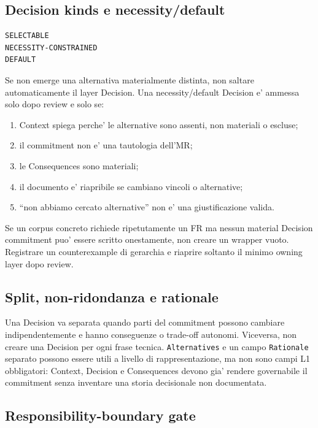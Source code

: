 \documentclass[11pt,a4paper]{article}
\begin{document}
\subsection{Decision kinds e necessity/default}
\closedtag

\begin{lstlisting}
SELECTABLE
NECESSITY-CONSTRAINED
DEFAULT
\end{lstlisting}

Se non emerge una alternativa materialmente distinta, non saltare automaticamente il layer Decision. Una necessity/default Decision e' ammessa solo dopo review e solo se:
\begin{enumerate}
  \item Context spiega perche' le alternative sono assenti, non materiali o escluse;
  \item il commitment non e' una tautologia dell'MR;
  \item le Consequences sono materiali;
  \item il documento e' riapribile se cambiano vincoli o alternative;
  \item ``non abbiamo cercato alternative'' non e' una giustificazione valida.
\end{enumerate}

\begin{ddtaopen}[title={Counterexample gate sulla gerarchia}]
Se un corpus concreto richiede ripetutamente un FR ma nessun material Decision commitment puo' essere scritto onestamente, non creare un wrapper vuoto. Registrare un counterexample di gerarchia e riaprire soltanto il minimo owning layer dopo review.
\end{ddtaopen}

\subsection{Split, non-ridondanza e rationale}
Una Decision va separata quando parti del commitment possono cambiare indipendentemente e hanno conseguenze o trade-off autonomi. Viceversa, non creare una Decision per ogni frase tecnica. \texttt{Alternatives} e un campo \texttt{Rationale} separato possono essere utili a livello di rappresentazione, ma non sono campi L1 obbligatori: Context, Decision e Consequences devono gia' rendere governabile il commitment senza inventare una storia decisionale non documentata.

\subsection{Responsibility-boundary gate}
\closedtag
\end{document}
